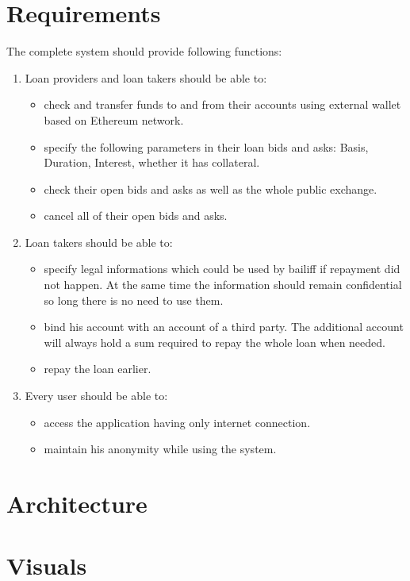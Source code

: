 \documentclass[a4paper,12pt,twoside,openany]{report}
\begin{document}
\section{Requirements}
The complete system should provide following functions:
\begin{enumerate}
\item Loan providers and loan takers should be able to:
\begin{itemize}
\item check and transfer funds to and from their accounts using external wallet based on Ethereum network.
\item specify the following parameters in their loan bids and asks: Basis, Duration, Interest, whether it has collateral.
\item check their open bids and asks as well as the whole public exchange.
\item cancel all of their open bids and asks.
\end{itemize}
\item Loan takers should be able to:
\begin{itemize}
\item specify legal informations which could be used by bailiff if repayment did not happen. At the same time the information should remain confidential so long there is no need to use them.
\item bind his account with an account of a third party. The additional account will always hold a sum required to repay the whole loan when needed.
\item repay the loan earlier.
\end{itemize}
\item Every user should be able to:
\begin{itemize}
\item access the application having only internet connection.
\item maintain his anonymity while using the system.
\end{itemize}
\end{enumerate}



\section{Architecture}

\section{Visuals}
\end{document}
